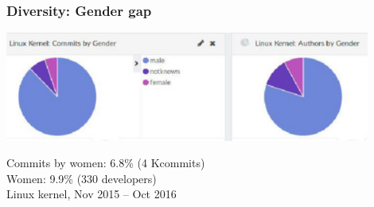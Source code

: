 \documentclass[17pt,aspectratio=169,hyperref=pdfusetitle]{beamer}
\begin{document}











\begin{frame}
\frametitle{Diversity: Gender gap}

  \includegraphics[width=12cm]{figs/linux-gender}
  
    Commits by women: 6.8\% (4 Kcommits) \\
    Women: 9.9\% (330 developers) \\
    Linux kernel, Nov 2015 -- Oct 2016 \\

\end{frame}
\end{document}
